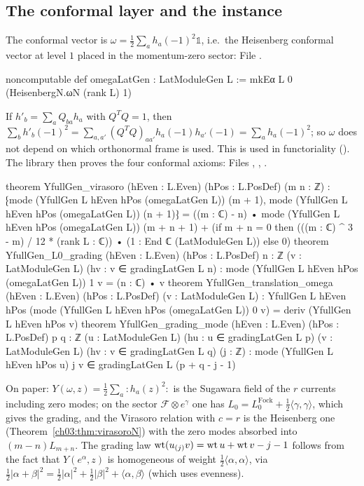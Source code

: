 \subsection{The conformal layer and the instance}

The conformal vector is $\omega=\frac12\sum_ah_a(-1)^2\mathbb 1$, i.e.\ the Heisenberg conformal
vector at level $1$ placed in the momentum-zero sector:
\noindent File .
\begin{leancode}
noncomputable def omegaLatGen : LatModuleGen L := mkEα L 0 (HeisenbergN.ωN (rank L) 1)
\end{leancode}
If $h'_b=\sum_aQ_{ba}h_a$ with $Q^TQ=1$, then $\sum_bh'_b(-1)^2=\sum_{a,a'}(Q^TQ)_{aa'}
h_a(-1)h_{a'}(-1)=\sum_ah_a(-1)^2$; so $\omega$ does not depend on which orthonormal frame is used.
This is used in functoriality (). The library then proves the four conformal axioms:
\noindent Files , , .
\begin{leancode}
theorem YfullGen_virasoro (hEven : L.Even) (hPos : L.PosDef) (m n : ℤ) :
    ⁅mode (YfullGen L hEven hPos (omegaLatGen L)) (m + 1),
      mode (YfullGen L hEven hPos (omegaLatGen L)) (n + 1)⁆
      = ((m : ℂ) - n) • mode (YfullGen L hEven hPos (omegaLatGen L)) (m + n + 1)
        + (if m + n = 0 then (((m : ℂ) ^ 3 - m) / 12 * (rank L : ℂ)) • (1 : End ℂ (LatModuleGen L))
           else 0)
theorem YfullGen_L0_grading (hEven : L.Even) (hPos : L.PosDef) {n : ℤ} (v : LatModuleGen L)
    (hv : v ∈ gradingLatGen L n) :
    mode (YfullGen L hEven hPos (omegaLatGen L)) 1 v = (n : ℂ) • v
theorem YfullGen_translation_omega (hEven : L.Even) (hPos : L.PosDef) (v : LatModuleGen L) :
    YfullGen L hEven hPos (mode (YfullGen L hEven hPos (omegaLatGen L)) 0 v)
      = deriv (YfullGen L hEven hPos v)
theorem YfullGen_grading_mode (hEven : L.Even) (hPos : L.PosDef) {p q : ℤ} (u : LatModuleGen L)
    (hu : u ∈ gradingLatGen L p) (v : LatModuleGen L) (hv : v ∈ gradingLatGen L q) (j : ℤ) :
    mode (YfullGen L hEven hPos u) j v ∈ gradingLatGen L (p + q - j - 1)
\end{leancode}
On paper: $Y(\omega,z)=\frac12\sum_a{:}h_a(z)^2{:}$ is the Sugawara field of the $r$ currents
including zero modes; on the sector $\mathcal F\otimes e^\gamma$ one has
$L_0=L_0^{\mathrm{Fock}}+\frac12\langle\gamma,\gamma\rangle$, which gives the grading, and the
Virasoro relation with $c=r$ is the Heisenberg one (Theorem~\ref{ch03:thm:virasoroN}) with the
zero modes absorbed into $(m-n)L_{m+n}$. The grading law
$\operatorname{wt}(u_{(j)}v)=\operatorname{wt} u+\operatorname{wt} v-j-1$ follows from the fact that $Y(e^\alpha,z)$ is homogeneous of
weight $\frac12\langle\alpha,\alpha\rangle$, via
$\frac12|\alpha+\beta|^2=\frac12|\alpha|^2+\frac12|\beta|^2+\langle\alpha,\beta\rangle$ (which uses
evenness).

